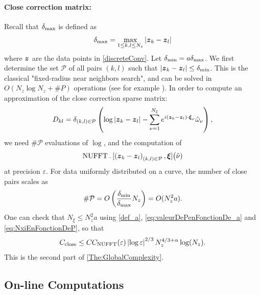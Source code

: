 \documentclass{article}
\begin{document}
\paragraph{Close correction matrix:} Recall that $\delta_{\max}$ is defined as 
\[\delta_{\max} = \max_{1\leq k,l\leq N_z} |\boldsymbol{z}_k - \boldsymbol{z}_l|\]
where $\boldsymbol{z}$ are the data points in \eqref{discreteConv}. Let $\delta_{\min} = a \delta_{\max}$. We first determine the set $\mathcal{P}$ of all pairs $(k,l)$ such that $\left\lvert \boldsymbol{z}_k - \boldsymbol{z}_l \right\rvert \leq \delta_{\min}$. This is the classical "fixed-radius near neighbors search", and can be solved in $O(N_z \log N_z + \# P)$ operations (see for example \cite{bentley1975multidimensional, bentley1977complexity,turau1991fixed,dickerson1990fixed}). In order to compute an approximation of the close correction sparse matrix:
\[D_{kl} = \delta_{(k,l) \in \mathcal{P}} \left( \log\left\lvert \boldsymbol{z}_k - \boldsymbol{z}_l \right\rvert - \sum_{\nu = 1}^{N_{\xi}}e^{i (\boldsymbol{z}_k - \boldsymbol{z}_l)\cdot \boldsymbol{\xi}_\nu} \hat{\omega}_\nu\right),\]
we need $\#\mathcal{P}$ evaluations of $\log$, and the computation of 
\[\operatorname{NUFFT}_-[\left(\boldsymbol{z}_k - \boldsymbol{z}_l\right)_{(k,l)\in\mathcal{P}},\boldsymbol{\xi}]\big(\hat{\nu})\]
at precision $\varepsilon$. For data uniformly distributed on a curve, the number of close pairs scales as 
\begin{equation}
	\label{eq:NombreDinteractionsProches}
	\# \mathcal{P} = O\left(\dfrac{\delta_{\min}}{\delta_{\max}} N_z\right) = O(N_z^2 a).
\end{equation}
One can check that $N_\xi \leq N_z^2a$ using \eqref{def_a}, \eqref{eq:valeurDePenFonctionDe_a} and \eqref{eq:NxiEnFonctionDeP}, so that 
\begin{equation}
	\label{Complex:assemble}
	C_{\textup{close}} \leq C C_{\textup{NUFFT}}(\varepsilon)\left\lvert \log{\varepsilon} \right\rvert^{2/3}N_z^{4/3 + \alpha}\log(N_z).
\end{equation}
This is the second part of \autoref{The:GlobalComplexity}. 
\subsection{On-line Computations}
\end{document}
